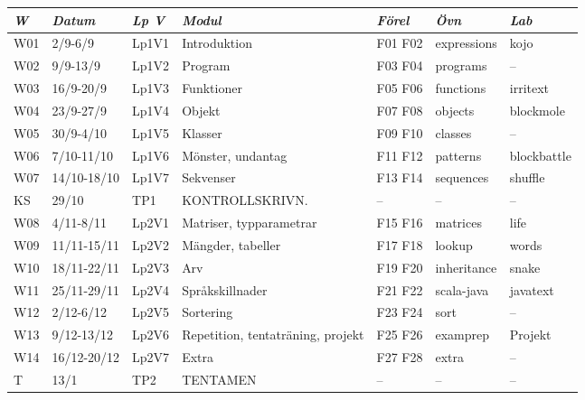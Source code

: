 \begin{tabular}{l|l|l|l|l|l|l}
\textit{W} & \textit{Datum} & \textit{Lp V} & \textit{Modul} & \textit{Förel} & \textit{Övn} & \textit{Lab} \\ \hline \hline
W01 & 2/9-6/9 & Lp1V1 & Introduktion & F01 F02 & expressions & kojo \\
W02 & 9/9-13/9 & Lp1V2 & Program & F03 F04 & programs & -- \\
W03 & 16/9-20/9 & Lp1V3 & Funktioner & F05 F06 & functions & irritext \\
W04 & 23/9-27/9 & Lp1V4 & Objekt & F07 F08 & objects & blockmole \\
W05 & 30/9-4/10 & Lp1V5 & Klasser & F09 F10 & classes & -- \\
W06 & 7/10-11/10 & Lp1V6 & Mönster, undantag & F11 F12 & patterns & blockbattle \\
W07 & 14/10-18/10 & Lp1V7 & Sekvenser & F13 F14 & sequences & shuffle \\
KS & 29/10 & TP1 & KONTROLLSKRIVN. & -- & -- & -- \\
W08 & 4/11-8/11 & Lp2V1 & Matriser, typparametrar & F15 F16 & matrices & life \\
W09 & 11/11-15/11 & Lp2V2 & Mängder, tabeller & F17 F18 & lookup & words \\
W10 & 18/11-22/11 & Lp2V3 & Arv & F19 F20 & inheritance & snake \\
W11 & 25/11-29/11 & Lp2V4 & Språkskillnader & F21 F22 & scala-java & javatext \\
W12 & 2/12-6/12 & Lp2V5 & Sortering & F23 F24 & sort & -- \\
W13 & 9/12-13/12 & Lp2V6 & Repetition, tentaträning, projekt & F25 F26 & examprep & Projekt \\
W14 & 16/12-20/12 & Lp2V7 & Extra & F27 F28 & extra & -- \\
T & 13/1 & TP2 & TENTAMEN & -- & -- & -- \\
\end{tabular}
